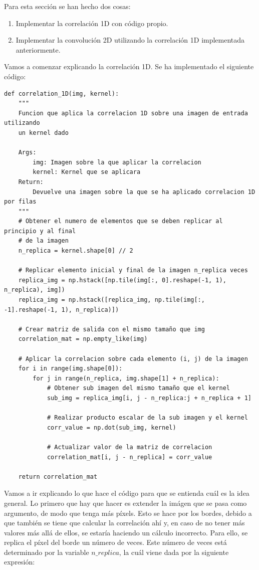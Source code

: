 \documentclass[11pt,a4paper]{article}
\begin{document}
Para esta sección se han hecho dos cosas:

\begin{enumerate}
	\item Implementar la correlación 1D con código propio.
	\item Implementar la convolución 2D utilizando la correlación 1D implementada anteriormente.
\end{enumerate}

Vamos a comenzar explicando la correlación 1D. Se ha implementado el siguiente código:

\begin{lstlisting}[caption={Función que realiza la correlación 1D},label={alg:corr-1d}]
def correlation_1D(img, kernel):
    """
    Funcion que aplica la correlacion 1D sobre una imagen de entrada utilizando
    un kernel dado

    Args:
        img: Imagen sobre la que aplicar la correlacion
        kernel: Kernel que se aplicara
    Return:
        Devuelve una imagen sobre la que se ha aplicado correlacion 1D por filas
    """
    # Obtener el numero de elementos que se deben replicar al principio y al final
    # de la imagen
    n_replica = kernel.shape[0] // 2

    # Replicar elemento inicial y final de la imagen n_replica veces
    replica_img = np.hstack([np.tile(img[:, 0].reshape(-1, 1), n_replica), img])
    replica_img = np.hstack([replica_img, np.tile(img[:, -1].reshape(-1, 1), n_replica)])

    # Crear matriz de salida con el mismo tamaño que img
    correlation_mat = np.empty_like(img)

    # Aplicar la correlacion sobre cada elemento (i, j) de la imagen
    for i in range(img.shape[0]):
        for j in range(n_replica, img.shape[1] + n_replica):
            # Obtener sub imagen del mismo tamaño que el kernel
            sub_img = replica_img[i, j - n_replica:j + n_replica + 1]

            # Realizar producto escalar de la sub imagen y el kernel
            corr_value = np.dot(sub_img, kernel)

            # Actualizar valor de la matriz de correlacion
            correlation_mat[i, j - n_replica] = corr_value

    return correlation_mat
\end{lstlisting}

Vamos a ir explicando lo que hace el código para que se entienda cuál es la idea general. Lo primero que hay que
hacer es extender la imágen que se pasa como argumento, de modo que tenga más píxels. Esto se hace por los bordes, debido
a que también se tiene que calcular la correlación ahí y, en caso de no tener más valores más allá de ellos, se estaría
haciendo un cálculo incorrecto. Para ello, se replica el píxel del borde un número de veces. Este número de veces
está determinado por la variable $n\_replica$, la cuál viene dada por la siguiente expresión:
\end{document}
